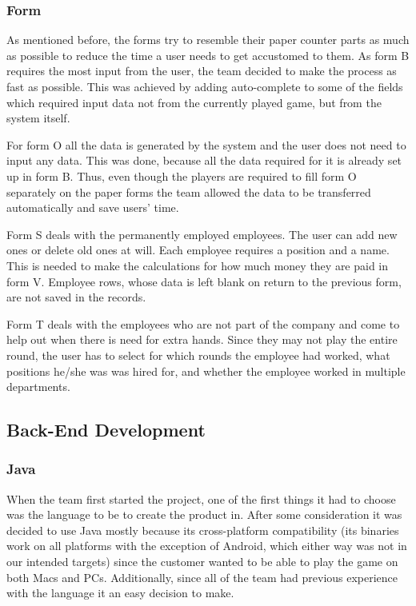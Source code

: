 \documentclass{l3proj}
\begin{document}
\subsubsection{Form}
As mentioned before, the forms try to resemble their paper counter parts as much as possible to reduce the time a user needs to get accustomed to them. As form B requires the most input from the user, the team decided to make the process as fast as possible. This was achieved by adding auto-complete to some of the fields which required input data not from the currently played game, but from the system itself.

For form O all the data is generated by the system and the user does not need to input any data. This was done, because all the data required for it is already set up in form B. Thus, even though the players are required to fill form O separately on the paper forms the team allowed the data to be transferred automatically and save users' time.

Form S deals with the permanently employed employees. The user can add new ones or delete old ones at will. Each employee requires a position and a name. This is needed to make the calculations for how much money they are paid in form V. Employee rows, whose data is left blank on return to the previous form, are not saved in the records.

Form T deals with the employees who are not part of the company and come to help out when there is need for extra hands. Since they may not play the entire round, the user has to select for which rounds the employee had worked, what positions  he/she was was hired for, and whether the employee worked in multiple departments.

\subsection{Back-End Development}
\subsubsection{Java}
When the team first started the project, one of the first things it had to choose was the language to be to create the product in. After some consideration it was decided to use Java mostly because its cross-platform compatibility (its binaries work on all platforms with the exception of Android, which either way was not in our intended targets) since the customer wanted to be able to play the game on both Macs and PCs. Additionally, since all of the team had previous experience with the language it an easy decision to make.
\end{document}
